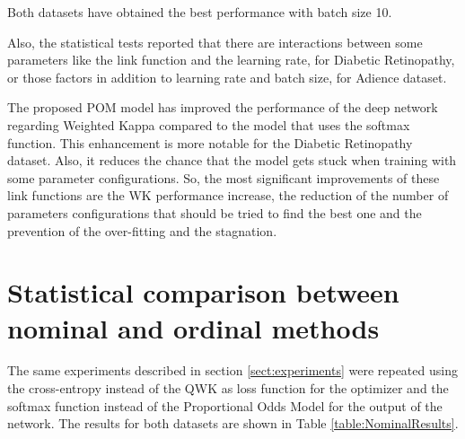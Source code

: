 \documentclass[10pt, a4paper, titlepage, twocolumn]{article}
\begin{document}
	Both datasets have obtained the best performance with batch size 10.
	
	Also, the statistical tests reported that there are interactions between some parameters like the link function and the learning rate, for Diabetic Retinopathy, or those factors in addition to learning rate and batch size, for Adience dataset.
	
	The proposed POM model has improved the performance of the deep network regarding Weighted Kappa compared to the model that uses the softmax function. This enhancement is more notable for the Diabetic Retinopathy dataset. Also, it reduces the chance that the model gets stuck when training with some parameter configurations. So, the most significant improvements of these link functions are the WK performance increase, the reduction of the number of parameters configurations that should be tried to find the best one and the prevention of the over-fitting and the stagnation.
	
	\printbibliography
	
	\appendix
	\section{Statistical comparison between nominal and ordinal methods}
	\label{app:NominalComparison}
	
	The same experiments described in section \ref{sect:experiments} were repeated using the cross-entropy instead of the QWK as loss function for the optimizer and the softmax function instead of the Proportional Odds Model for the output of the network.
	The results for both datasets are shown in Table \ref{table:NominalResults}.
	
\end{document}
